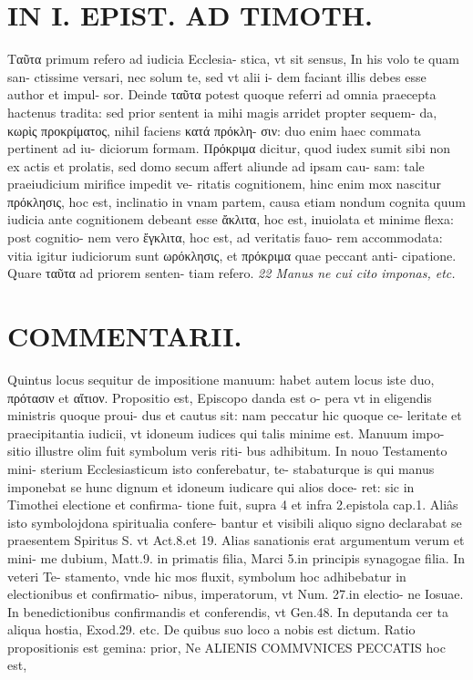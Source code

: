 \documentclass{article}
\begin{document}
\begin{pages}
\section*{IN I. EPIST. AD TIMOTH. }\pstart Ταῦτα primum refero ad iudicia Ecclesia- stica, vt sit sensus, In his volo te quam san- ctissime versari, nec solum te, sed vt alii i- dem faciant illis debes esse author et impul- sor. Deinde ταῦτα potest quoque referri ad omnia praecepta hactenus tradita: sed prior sentent ia mihi magis arridet propter sequem- da,  κωρὶς προκρίματος, nihil faciens κατά πρόκλη- σιν: duo enim haec commata pertinent ad iu- diciorum formam. Πρόκριμα dicitur, quod iudex sumit sibi non ex actis et prolatis, sed domo secum affert aliunde ad ipsam cau- sam: tale praeiudicium mirifice impedit ve- ritatis cognitionem, hinc enim mox nascitur πρόκλησις, hoc est, inclinatio in vnam partem, causa etiam nondum cognita quum iudicia ante cognitionem debeant esse ἄκλιτα, hoc est, inuiolata et minime flexa: post cognitio- nem vero ἔγκλιτα, hoc est, ad veritatis fauo- rem accommodata: vitia igitur iudiciorum sunt ωρόκλησις, et πρόκριμα quae peccant anti- cipatione. Quare ταῦτα ad priorem senten- tiam refero.  \pend
\marginpar{[ p.137 ]}
\textit{22 Manus ne cui cito imponas, etc. }
\marginpar{[ p.138 ]}
\section*{COMMENTARII. }\pstart Quintus locus sequitur de impositione manuum: habet autem locus iste duo, πρότασιν et αἴτιον. Propositio est, Episcopo danda est o- pera vt in eligendis ministris quoque proui- dus et cautus sit: nam peccatur hic quoque ce- leritate et praecipitantia iudicii, vt idoneum iudices qui talis minime est. Manuum impo- sitio illustre olim fuit symbolum veris riti- bus adhibitum. In nouo Testamento mini- sterium Ecclesiasticum isto conferebatur, te- stabaturque is qui manus imponebat se hunc dignum et idoneum iudicare qui alios doce- ret: sic in Timothei electione et confirma- tione fuit, supra 4 et infra 2.epistola cap.1. Aliâs isto symbolojdona spiritualia confere- bantur et visibili aliquo signo declarabat se praesentem Spiritus S. vt Act.8.et 19. Alias sanationis erat argumentum verum et mini- me dubium, Matt.9. in primatis filia, Marci 5.in principis synagogae filia. In veteri Te- stamento, vnde hic mos fluxit, symbolum hoc adhibebatur in electionibus et confirmatio- nibus, imperatorum, vt Num. 27.in electio- ne Iosuae. In benedictionibus confirmandis et conferendis, vt Gen.48. In deputanda cer ta aliqua hostia, Exod.29. etc. De quibus suo loco a nobis est dictum.  \pend\pstart Ratio propositionis est gemina: prior, Ne ALIENIS COMMVNICES PECCATIS hoc est,  \pend

\end{pages}
\end{document}
